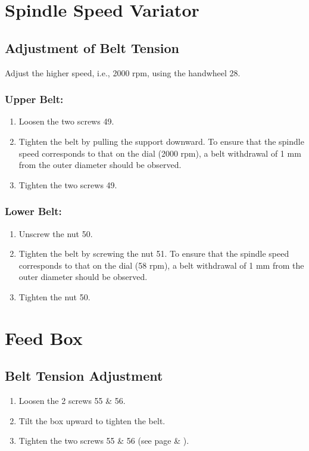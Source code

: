 \chapter{Spindle Speed Variator}\label{chap:spindle_speed_variator}
\section*{Adjustment of Belt Tension}
Adjust the higher speed, i.e., 2000 rpm, using the handwheel 28.

\subsection*{Upper Belt:}
\begin{enumerate}
    \item Loosen the two screws 49.
    \item Tighten the belt by pulling the support downward. To ensure that the spindle speed corresponds to that on the dial (2000 rpm), a belt withdrawal of 1 mm from the outer diameter should be observed.
    \item Tighten the two screws 49.
\end{enumerate}

\subsection*{Lower Belt:}
\begin{enumerate}
    \item Unscrew the nut 50.
    \item Tighten the belt by screwing the nut 51. To ensure that the spindle speed corresponds to that on the dial (58 rpm), a belt withdrawal of 1 mm from the outer diameter should be observed.
    \item Tighten the nut 50.
\end{enumerate}

{\let\clearpage\relax \chapter{Feed Box}}

\section*{Belt Tension Adjustment}

\begin{enumerate}
    \item Loosen the 2 screws 55 \& 56.
    \item Tilt the box upward to tighten the belt.
    \item Tighten the two screws 55 \& 56 (see page \pageref{fig:speeds_and_feeds_controls} \& \pageref{fig:speeds_and_feeds_controls_2}).
\end{enumerate}
